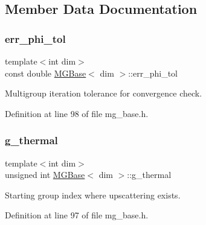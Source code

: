 \subsection{Member Data Documentation}
\mbox{\label{class_m_g_base_af50b1bdc92270c342524eacfc644170c}} 
\subsubsection{\texorpdfstring{err\+\_\+phi\+\_\+tol}{err\_phi\_tol}}
{\footnotesize\ttfamily template$<$int dim$>$ \\
const double \hyperlink{class_m_g_base}{M\+G\+Base}$<$ dim $>$\+::err\+\_\+phi\+\_\+tol\hspace{0.3cm}{\ttfamily [protected]}}



Multigroup iteration tolerance for convergence check. 



Definition at line 98 of file mg\+\_\+base.\+h.

\mbox{\label{class_m_g_base_a7df1f6ce51cf6eb033420be98b1f0019}} 
\subsubsection{\texorpdfstring{g\+\_\+thermal}{g\_thermal}}
{\footnotesize\ttfamily template$<$int dim$>$ \\
unsigned int \hyperlink{class_m_g_base}{M\+G\+Base}$<$ dim $>$\+::g\+\_\+thermal\hspace{0.3cm}{\ttfamily [protected]}}



Starting group index where upscattering exists. 



Definition at line 97 of file mg\+\_\+base.\+h.

\mbox{\label{class_m_g_base_ad8a9d4163bb31470fff74fe787c23788}} 
